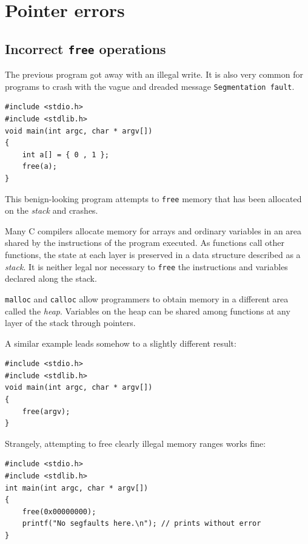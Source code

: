 \documentclass{book}
\begin{document}
\section{Pointer errors}

\subsection{Incorrect \texttt{free} operations}
The previous program got away with an illegal write. It is also very common for programs to crash with the vague and dreaded message \texttt{Segmentation fault}.

\begin{lstlisting}[caption={todo}, captionpos=b, mathescape, xleftmargin=.25in, xrightmargin=.25in]
#include <stdio.h>
#include <stdlib.h>
void main(int argc, char * argv[])
{
    int a[] = { 0 , 1 };
    free(a);
}
\end{lstlisting}

This benign-looking program attempts to \texttt{free} memory that has been allocated on the \textit{stack} and crashes.

Many C compilers allocate memory for arrays and ordinary variables in an area shared by the instructions of the program executed. As functions call other functions, the state at each layer is preserved in a data structure described as a \textit{stack}. It is neither legal nor necessary to \texttt{free} the instructions and variables declared along the stack.

\texttt{malloc} and \texttt{calloc} allow programmers to obtain memory in a different area called the \textit{heap}. Variables on the heap can be shared among functions at any layer of the stack through pointers.

A similar example leads somehow to a slightly different result:

\begin{lstlisting}[caption={todo}, captionpos=b, mathescape, xleftmargin=.25in, xrightmargin=.25in]
#include <stdio.h>
#include <stdlib.h>
void main(int argc, char * argv[])
{
    free(argv);
}
\end{lstlisting}

Strangely, attempting to free clearly illegal memory ranges works fine:

\begin{lstlisting}[caption={todo}, captionpos=b, mathescape, xleftmargin=.25in, xrightmargin=.25in]
#include <stdio.h>
#include <stdlib.h>
int main(int argc, char * argv[])
{
    free(0x00000000);
    printf("No segfaults here.\n"); // prints without error
}
\end{lstlisting}
\end{document}
